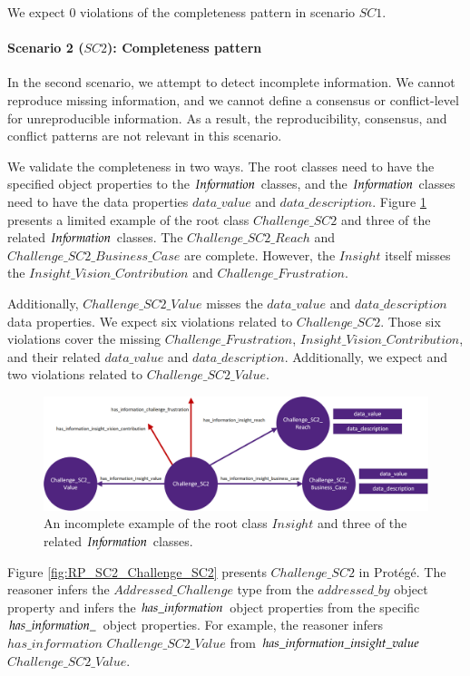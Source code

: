 We expect $0$ violations of the completeness pattern in scenario $SC1$.

\paragraph{Scenario 2 ($SC2$): Completeness pattern}
In the second scenario, we attempt to detect incomplete information. We cannot reproduce missing information, and we cannot define a consensus or conflict-level for unreproducible information. As a result, the reproducibility, consensus, and conflict patterns are not relevant in this scenario.

We validate the completeness in two ways. The root classes need to have the specified object properties to the $In{\mkern-2mu f\mkern-3mu}ormation$ classes, and the $In{\mkern-2mu f\mkern-3mu}ormation$ classes need to have the data properties $data\_value$ and $data\_description$. Figure \ref{fig:RP_SC2_Completeness} presents a limited example of the root class $Challenge\_SC2$ and three of the related $In{\mkern-2mu f\mkern-3mu}ormation$ classes. The $Challenge\_SC2\_Reach$ and $Challenge\_SC2\_Business\_Case$ are complete. However, the $Insight$ itself misses the $Insight\_Vision\_Contribution$ and $Challenge\_Frustration$. 

Additionally, $Challenge\_SC2\_Value$ misses the $data\_value$ and $data\_description$ data properties. We expect six violations related to $Challenge\_SC2$. Those six violations cover the missing $Challenge\_Frustration$, $Insight\_Vision\_Contribution$, and their related $data\_value$ and $data\_description$. Additionally, we expect and two violations related to $Challenge\_SC2\_Value$.

\begin{figure}[H]
\centering
  \includegraphics[width=17cm]{../../Images/05_Validation/05_RP_SC2_Completeness.png}
  \caption{An incomplete example of the root class $Insight$ and three of the related $In{\mkern-2mu f\mkern-3mu}ormation$ classes.}
  \label{fig:RP_SC2_Completeness}
\end{figure}

Figure \ref{fig:RP_SC2_Challenge_SC2} presents $Challenge\_SC2$ in Prot\'eg\'e. The reasoner infers the $Addressed\_Challenge$ type from the $addressed\_by$ object property and infers the $has\_in{\mkern-2mu f\mkern-3mu}ormation$ object properties from the specific $has\_in{\mkern-2mu f\mkern-3mu}ormation\_$ object properties. For example, the reasoner infers $has\_information$ $Challenge\_SC2\_Value$ from $has\_in{\mkern-2mu f\mkern-3mu}ormation\_insight\_value$ $Challenge\_SC2\_Value$.

